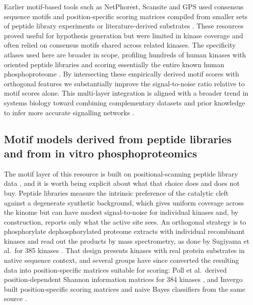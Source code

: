 \documentclass[
  number,
  preprint,
  onecolumn]{elsarticle}
\begin{document}
Earlier motif-based tools such as NetPhorest, Scansite and GPS used
consensus sequence motifs and position-specific scoring matrices
compiled from smaller sets of peptide library experiments or
literature-derived substrates
\citep{Miller2008-ey, Obenauer2003-fc, Wang2020-hj}. These resources
proved useful for hypothesis generation but were limited in kinase
coverage and often relied on consensus motifs shared across related
kinases. The specificity atlases used here are broader in scope,
profiling hundreds of human kinases with oriented peptide libraries and
scoring essentially the entire known human phosphoproteome
\citep{Johnson2023-ai, Yaron-Barir2024-lv}. By intersecting these
empirically derived motif scores with orthogonal features we
substantially improve the signal-to-noise ratio relative to motif scores
alone. This multi-layer integration is aligned with a broader trend in
systems biology toward combining complementary datasets and prior
knowledge to infer more accurate signalling networks
\citep{Ochoa2020-og, Yaron-Barir2024-lv, Licata2020-fm}.

\subsection{Motif models derived from peptide libraries and from in
vitro
phosphoproteomics}\label{motif-models-derived-from-peptide-libraries-and-from-in-vitro-phosphoproteomics}

The motif layer of this resource is built on positional-scanning peptide
library data \citep{Johnson2023-ai, Yaron-Barir2024-lv}, and it is worth
being explicit about what that choice does and does not buy. Peptide
libraries measure the intrinsic preference of the catalytic cleft
against a degenerate synthetic background, which gives uniform coverage
across the kinome but can have modest signal-to-noise for individual
kinases and, by construction, reports only what the active site sees. An
orthogonal strategy is to phosphorylate dephosphorylated proteome
extracts with individual recombinant kinases and read out the products
by mass spectrometry, as done by Sugiyama et al.~for 385 kinases
\citep{Sugiyama2019-ki}. That design presents kinases with real protein
substrates in native sequence context, and several groups have since
converted the resulting data into position-specific matrices suitable
for scoring: Poll et al.~derived position-dependent Shannon information
matrices for 384 kinases \citep{Poll2024-km}, and Invergo built
position-specific scoring matrices and naive Bayes classifiers from the
same source \citep{Invergo2022-iv}.
\end{document}
